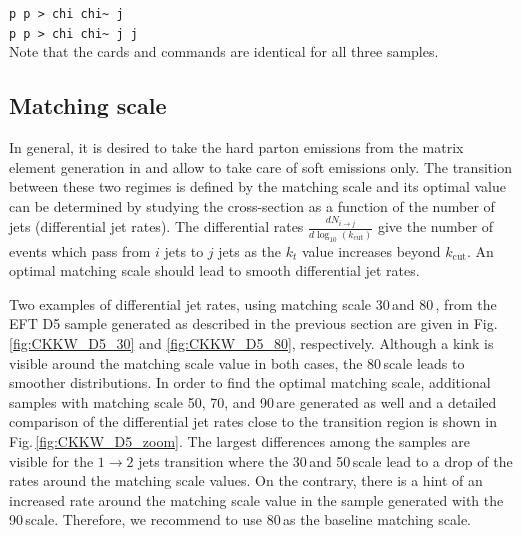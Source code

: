 \texttt{p p > chi chi\~{ } j}\\

\texttt{p p > chi chi\~{ } j j}\\
Note that the \madgraph cards and \pythiaEight commands are identical for all three samples.




\subsection{Matching scale}

In general, it is desired to take the hard parton emissions from the matrix element generation in \madgraph and allow \pythiaEight to take care of soft emissions only. The transition between these two regimes is defined by the matching scale and its optimal value can be determined by studying the cross-section as a function of the number of jets (differential jet rates). The differential rates $\frac{dN_{i\to j}}{d \log_{10}(k_\textrm{cut})}$ give the number of events which pass from $i$ jets to $j$ jets as the $k_t$ value increases beyond $k_\textrm{cut}$. An optimal matching scale should lead to smooth differential jet rates.

Two examples of differential jet rates, using matching scale 30\,\gev and 80\,\gev, from the EFT D5 sample generated as described in the previous section are given in Fig.\,\ref{fig:CKKW_D5_30} and \ref{fig:CKKW_D5_80}, respectively.
Although a kink is visible around the matching scale value in both cases, the 80\,\gev scale leads to smoother distributions. 
In order to find the optimal matching scale, additional samples with matching scale 50, 70, and 90\,\gev are generated as well and a detailed comparison of the differential jet rates close to the transition region is shown in Fig.\,\ref{fig:CKKW_D5_zoom}.
The largest differences among the samples are visible for the $1\rightarrow2$ jets transition where the 30\,\gev and 50\,\gev scale lead to a drop of the rates around the matching scale values. On the contrary, there is a hint of an increased rate around the matching scale value in the sample generated with the 90\,\gev scale. Therefore, we recommend to use 80\,\gev as the baseline matching scale.



